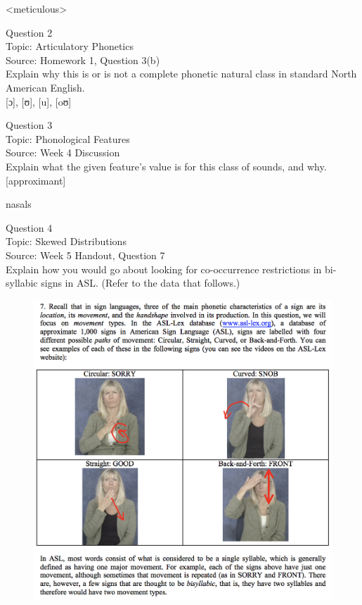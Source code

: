 \documentclass[12pt]{article}
\begin{document}
<meticulous>


\newpage

{\large Question 2}\\

Topic: Articulatory Phonetics\\
Source: Homework 1, Question 3(b)\\

Explain why this is or is not a complete phonetic natural class in standard North American English.\\

{[ɔ]}, {[ʊ]}, {[u]}, {[oʊ]}


\newpage

{\large Question 3}\\

Topic: Phonological Features\\
Source: Week 4 Discussion\\

Explain what the given feature’s value is for this class of sounds, and why.\\

{[approximant]}

nasals


\newpage

{\large Question 4}\\

Topic: Skewed Distributions\\
Source: Week 5 Handout, Question 7\\

Explain how you would go about looking for co-occurrence restrictions in bi-syllabic signs in ASL. (Refer to the data that follows.)\\

\begin{figure}[H]
\includegraphics{../images/ASL_movement.png}
\end{figure}
\end{document}
